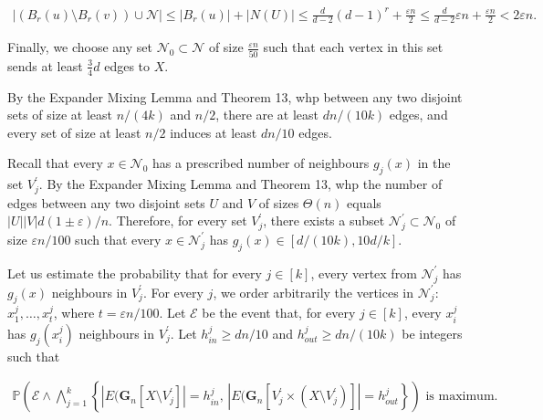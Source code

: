 \[\begin{gathered}
|(B_{r}(u)\setminus B_{r}(v))\cup\mathcal{N}|\leq|B_{r}(u)|+|N(U)|\leq\frac{d}{d-2}(d-1)^{r}+\frac{\varepsilon n}{2}\leq\frac{d}{d-2}\varepsilon n+\frac{\varepsilon n}{2}<2\varepsilon n.
\end{gathered}\]


Finally, we choose any set $\mathcal{N}_{0}\subset\mathcal{N}$ of size $\frac{\varepsilon n}{50}$ such that each vertex in this set sends at least $\frac{3}{4}d$ edges to $X$.\par




By the Expander Mixing Lemma and Theorem 13, whp between any two disjoint sets of size at least $n/(4k)$ and $n/2$, there are at least $dn/(10k)$ edges, and every set of size at least $n/2$ induces at least $dn/10$ edges.\par




Recall that every $x\in\mathcal{N}_{0}$ has a prescribed number of neighbours $g_{j}(x)$ in the set $V^{\prime}_{j}$.
By the Expander Mixing Lemma and Theorem 13, whp the number of edges between any two disjoint sets $U$ and $V$ of sizes $\Theta(n)$ equals $|U||V|d(1\pm\varepsilon)/n$. Therefore, for every set $V^{\prime}_{j}$, there exists a subset $\mathcal{N}^{\prime}_{j}\subset\mathcal{N}_{0}$ of size $\varepsilon n/100$ such that every $x\in\mathcal{N}^{\prime}_{j}$ has $g_{j}(x)\in[d/(10k),10d/k]$.\par




Let us estimate the probability that for every $j\in[k]$, every vertex from $\mathcal{N}^{\prime}_{j}$ has $g_{j}(x)$ neighbours in $V^{\prime}_{j}$. For every $j$, we order arbitrarily the vertices in $\mathcal{N}^{\prime}_{j}$: $x^{j}_{1},\ldots,x^{j}_{t}$, where
$t=\varepsilon n/100$. Let $\mathcal{E}$ be the event that, for every $j\in[k]$, every $x^{j}_{i}$ has $g_{j}(x^{j}_{i})$ neighbours in $V^{\prime}_{j}$. Let $h^{j}_{in}\geq dn/10$ and $h^{j}_{out}\geq dn/(10k)$ be integers such that\par


\[\begin{gathered}
\mathbb{P}\left(\mathcal{E}\wedge\bigwedge_{j=1}^{k}\left\{|E(\mathbf{G}_{n}[X\setminus V^{\prime}_{j}]|=h^{j}_{in},\,|E(\mathbf{G}_{n}[V^{\prime}_{j}\times(X\setminus V^{\prime}_{j})]|=h^{j}_{out}\right\}\right)\text{ is maximum}.
\end{gathered}\]


